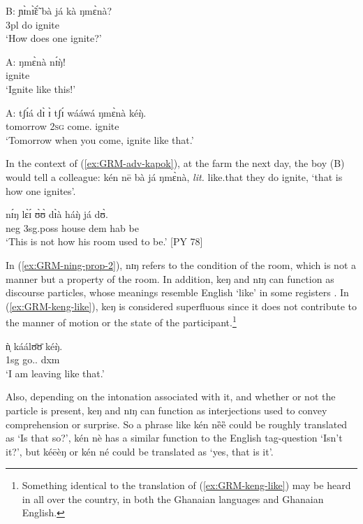\begin{exe}
\begin{exe}
\begin{exe}
\begin{exe}
\begin{exe}
\begin{exe}
\begin{exe}
\begin{exe}
\begin{exe}
\begin{exe}
\begin{exe}
\begin{exe}
 \ex\label{ex:GRM-adv-kapok-B}
\gll B:  ɲɪ̀nɪ̃̀ɛ̃́ bà já kà ŋmɛ̀nà?\\
{} {\q} {\sc 3pl} do {\egr} ignite\\
\glt `How does one ignite?' 

 \ex\label{ex:GRM-adv-kapok-A-2}
\gll  A: ŋmɛ̀nà nɪ́ŋ̀!\\
{} ignite {\dxm}\\
\glt `Ignite like this!'

 \ex\label{ex:GRM-adv-kapok-A-3}
 \gll  A: tʃɪ́á dɪ̀ ɪ̀ tʃɪ́ wááwá ŋmɛ̀nà kéŋ̀.\\
{} tomorrow {\conn} \textsc{2sg} {\cras} come.{\pfv} ignite {\dxm}\\
\glt `Tomorrow when you come, ignite like that.'
 
\z 
 \z  
 
In the context of (\ref{ex:GRM-adv-kapok}), at the farm the next day, the boy (B) would tell a colleague: {\sls  kén nē bà já ŋmɛ̀nà},  {\it lit.} like.that they do ignite, `that is how one ignites'. 


\ea\label{ex:GRM-ning-prop-2}
 \gll nɪ́ŋ lɛ̀ɪ́ ʊ̀ʊ̀ dɪ̀à háŋ̀ já dʊ̀.\\
 {\dxm} {\sc neg}  {\sc 3sg.poss} house {\sc dem} {\sc hab} be\\
\glt  `This is not how his room used to be.' [PY 78]

\z


In (\ref{ex:GRM-ning-prop-2}), {\sls nɪŋ} refers to the condition of  the room,
which is not a manner  but a property of the room. 
In addition, {\sls keŋ} and 
{\sls nɪŋ} can function as  discourse particles, whose
meanings resemble   English `like' in some registers \citep{Muff02}. In
(\ref{ex:GRM-keng-like}), {\sls keŋ} is considered superfluous since it does not
contribute to the manner of  motion or the state of the
participant.\footnote{Something identical to the translation of
(\ref{ex:GRM-keng-like}) may be heard in all over the country, in both the Ghanaian languages and Ghanaian English.} 
 
 \ea\label{ex:GRM-keng-like} 
 \gll ǹ̩ káálʊ̄ʊ̄ kéŋ̀.\\
 {\sc 1sg} go.{\ipfv .\foc}  {\sc dxm}\\
 \glt `I am leaving like that.'
\z

Also, depending on the intonation associated with it, and whether or not  the  particle  is  present, {\sls keŋ} and {\sls nɪŋ} can function as  interjections used to convey comprehension or surprise. So a phrase like {\sls kén nȅȅ} could be roughly translated as `Is that so?', {\sls kén nè}   has a similar function to the English  tag-question `Isn't it?', but {\sls kéēèŋ} or {\sls kén{\ꜜ} né} could be translated as `yes, that is it'. 


\end{exe}
\end{exe}
\end{exe}
\end{exe}
\end{exe}
\end{exe}
\end{exe}
\end{exe}
\end{exe}
\end{exe}
\end{exe}
\end{exe}
